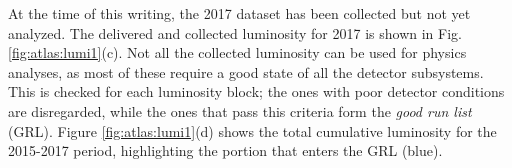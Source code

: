 At the time of this writing, the 2017 dataset has been collected but not yet analyzed. The delivered and collected luminosity for 2017 is shown in Fig. \ref{fig:atlas:lumi1}(c). Not all the collected luminosity can be used for physics analyses, as most of these require a good state of all the detector subsystems. This is checked for each luminosity block; the ones with poor detector conditions are disregarded, while the ones that pass this criteria form the \textit{good run list} (GRL). Figure \ref{fig:atlas:lumi1}(d) shows the total cumulative luminosity for the 2015-2017 period, highlighting the portion that enters the GRL (blue). 

